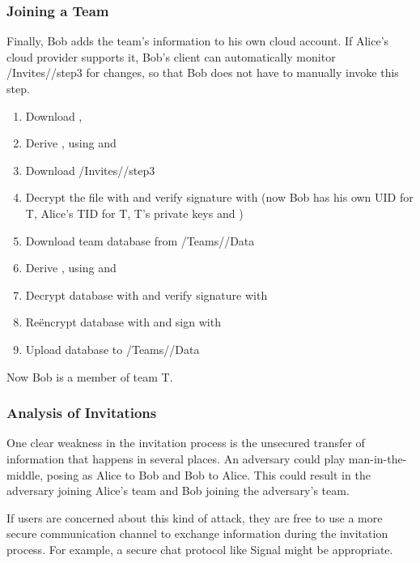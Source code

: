 \documentclass[pldi,10pt,preprint]{sigplanconf-pldi16}
\begin{document}
\subsubsection{Joining a Team}

Finally, Bob adds the team's information to his own cloud account.
If Alice's cloud provider supports it, Bob's client can automatically monitor \slash Invites\slash {}\slash step3 for changes, so that Bob does not have to manually invoke this step.

\begin{enumerate}
\item Download , 
\item Derive , using  and 
\item Download \slash Invites\slash {}\slash step3
\item Decrypt the file with  and verify signature with  (now Bob has his own UID for T, Alice's TID for T, T's private keys and )
\item Download team database from \slash Teams\slash {}\slash Data
\item Derive , using  and 
\item Decrypt database with  and verify signature with 
\item Re\"{e}ncrypt database with  and sign with 
\item Upload database to \slash Teams\slash {}\slash Data
\end{enumerate}

Now Bob is a member of team T.

\subsubsection{Analysis of Invitations}

One clear weakness in the invitation process is the unsecured transfer of information that happens in several places.
An adversary could play man-in-the-middle, posing as Alice to Bob and Bob to Alice.
This could result in the adversary joining Alice's team and Bob joining the adversary's team.

If users are concerned about this kind of attack, they are free to use a more secure communication channel to exchange information during the invitation process.
For example, a secure chat protocol like Signal might be appropriate.
\end{document}
